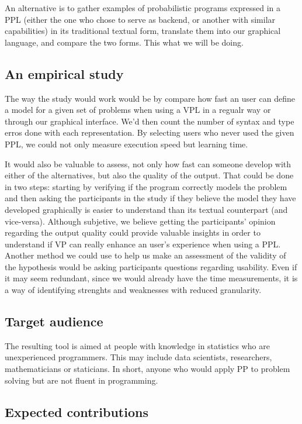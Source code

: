 An alternative is to gather examples of probabilistic programs expressed in a
PPL (either the one who chose to serve as backend, or another with similar
capabilities) in its traditional textual form, translate them into our graphical
language, and compare the two forms. This what we will be doing.

\subsection{An empirical study}

The way the study would work would be by compare how fast an user can define a model for a given set of problems
when using a VPL in a regualr way or through our graphical interface. We'd then
count the number of syntax and type erros done with each representation. By
selecting users who never used the given PPL, we could not only measure execution
speed but learning time.

It would also be valuable to assess, not only how fast can someone develop with either
of the alternatives, but also the quality of the output. That could be done in two
steps: starting by verifying if the program correctly models the problem and then
asking the participants in the study if they believe the model they
have developed graphically is easier to understand than its textual counterpart (and
vice-versa).
Although subjetive, we believe getting the participants' opinion
regarding the output quality could provide valuable insights in order to understand if VP can
really enhance an user's experience when using a PPL. Another method we could use
to help us make an assessment of the validity of the hypothesis would be asking
participants questions regarding usability. Even if it may seem redundant, since
we would already have the time measurements, it is a way of identifying strenghts and
weaknesses with reduced granularity.

\subsection{Target audience}

The resulting tool is aimed at people with knowledge in statistics
who are unexperienced programmers. This may include data scientists, researchers,
mathematicians or staticians. In short, anyone who would apply PP to problem
solving but are not fluent in programming.

\subsection{Expected contributions}

